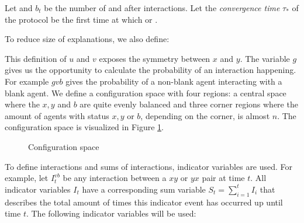 Let  and $b_t$ be the number of  and  after  interactions. Let the \emph{convergence time} $\tau_*$ of the protocol be the first time  at which  or .

To reduce size of explanations, we also define:
\begin{description}
    \centering
    \item[] 
    \item[] 
    \item[] 
\end{description}

This definition of $u$ and $v$ exposes the symmetry between $x$ and $y$. The variable $g$ gives us the opportunity to calculate the probability of an interaction happening. For example $gvb$ gives the probability of a non-blank agent interacting with a blank agent. We define a configuration space with four regions: a central space where the $x, y$ and $b$ are quite evenly balanced and three corner regions where the amount of agents with status $x, y$ or $b$, depending on the corner, is almost $n$. The configuration space is visualized in Figure \ref{fig:configurationSpace}.

\begin{figure}[H]
    \centering
    
    \caption{Configuration space}
    \label{fig:configurationSpace}
\end{figure}


To define interactions and sums of interactions, indicator variables are used. For example, let $I^{vb}_t$ be any interaction between a $xy$ or $yx$ pair at time $t$. All indicator variables $I_t$ have a corresponding sum variable $S_t = \sum^t_{i=1}I_i$ that describes the total amount of times this indicator event has occurred up until time $t$. The following indicator variables will be used:

